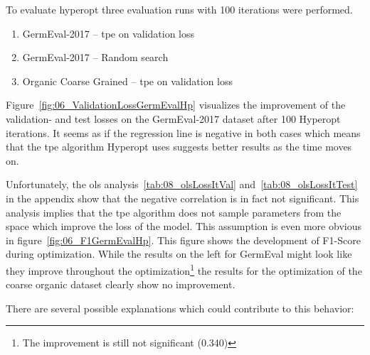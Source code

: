 To evaluate hyperopt three evaluation runs with 100 iterations were performed.

\begin{enumerate}
    \item GermEval-2017 -- \gls{tpe} on validation loss
    \item GermEval-2017 -- Random search
    \item Organic Coarse Grained -- \gls{tpe} on validation loss
\end{enumerate}

Figure~\ref{fig:06_ValidationLossGermEvalHp} visualizes the improvement of the validation- and test losses on the GermEval-2017 dataset after 100 Hyperopt iterations. It seems as if the regression line is negative in both cases which means that the \gls{tpe} algorithm Hyperopt uses suggests better results as the time moves on.

Unfortunately, the \gls{ols} analysis~\ref{tab:08_olsLossItVal} and~\ref{tab:08_olsLossItTest} in the appendix show that the negative correlation is in fact not significant. This analysis implies that the \gls{tpe} algorithm does not sample parameters from the space which improve the loss of the model. This assumption is even more obvious in figure~\ref{fig:06_F1GermEvalHp}. This figure shows the development of F1-Score during optimization. While the results on the left for GermEval might look like they improve throughout the optimization\footnote{The improvement is still not significant {(0.340)}} the results for the optimization of the coarse organic dataset clearly show no improvement.
\medskip

There are several possible explanations which could contribute to this behavior:

